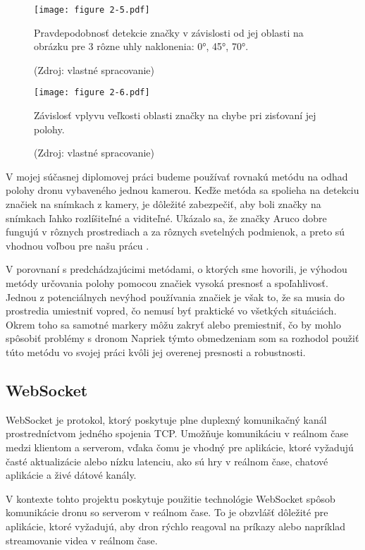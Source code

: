 \begin{figure}[ht!]
    \centering 
    \texttt{[image: figure 2-5.pdf]}
    \caption{Pravdepodobnosť detekcie značky v závislosti od jej oblasti na obrázku pre 3 rôzne uhly naklonenia: 0°, 45°, 70°.}
    \captionsetup{font=footnotesize, justification=centering, skip=5pt}
    \caption*{(Zdroj: vlastné spracovanie)}
    \label{o:2-5}
\end{figure}

\begin{figure}[ht!]
    \centering
    \texttt{[image: figure 2-6.pdf]} 
    \caption{Závislosť vplyvu veľkosti oblasti značky na chybe pri zisťovaní jej polohy.}
    \captionsetup{font=footnotesize, justification=centering, skip=5pt}
    \caption*{(Zdroj: vlastné spracovanie)}
    \label{o:2-6}
\end{figure}

V mojej súčasnej diplomovej práci budeme používať rovnakú metódu na odhad polohy dronu vybaveného jednou kamerou. Keďže metóda sa spolieha na detekciu značiek na snímkach z kamery, je dôležité zabezpečiť, aby boli značky na snímkach ľahko rozlíšiteľné a viditeľné. Ukázalo sa, že značky Aruco dobre fungujú v rôznych prostrediach a za rôznych svetelných podmienok, a preto sú vhodnou voľbou pre našu prácu \citep{Cheng2017}.

V porovnaní s predchádzajúcimi metódami, o ktorých sme hovorili, je výhodou metódy určovania polohy pomocou značiek vysoká presnosť a spoľahlivosť. Jednou z potenciálnych nevýhod používania značiek je však to, že sa musia do prostredia umiestniť vopred, čo nemusí byť praktické vo všetkých situáciách. Okrem toho sa samotné markery môžu zakryť alebo premiestniť, čo by mohlo spôsobiť problémy s dronom Napriek týmto obmedzeniam som sa rozhodol použiť túto metódu vo svojej práci kvôli jej overenej presnosti a robustnosti.

\subsection{WebSocket}
WebSocket je protokol, ktorý poskytuje plne duplexný komunikačný kanál prostredníctvom jedného spojenia TCP. Umožňuje komunikáciu v reálnom čase medzi klientom a serverom, vďaka čomu je vhodný pre aplikácie, ktoré vyžadujú časté aktualizácie alebo nízku latenciu, ako sú hry v reálnom čase, chatové aplikácie a živé dátové kanály.

V kontexte tohto projektu poskytuje použitie technológie WebSocket spôsob komunikácie dronu so serverom v reálnom čase. To je obzvlášť dôležité pre aplikácie, ktoré vyžadujú, aby dron rýchlo reagoval na príkazy alebo napríklad streamovanie videa v reálnom čase.

